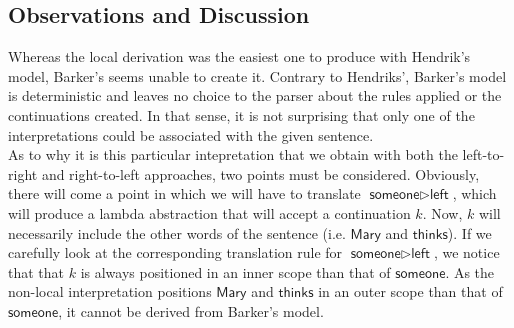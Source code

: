 \documentclass[]{article}
\newcommand{\W}[1]{\textsf{#1}}
\newcommand{\AppL}{\mathbin{\triangleright}}
\begin{document}
\subsection{Observations and Discussion}
Whereas the local derivation was the easiest one to produce with Hendrik's model, Barker's seems unable to create it. Contrary to Hendriks', Barker's model is deterministic and leaves no choice to the parser about the rules applied or the continuations created. In that sense, it is not surprising that only one of the interpretations could be associated with the given sentence.\\
As to why it is this particular intepretation that we obtain with both the left-to-right and right-to-left approaches, two points must be considered. Obviously, there will come a point in which we will have to translate $\W{someone}\AppL\W{left}$, which will produce a lambda abstraction that will accept a continuation $k$.  Now, $k$ will necessarily include the other words of the sentence (i.e. $\W{Mary}$ and $\W{thinks}$). If we carefully look at the corresponding translation rule for $\W{someone}\AppL\W{left}$, we notice that that $k$ is always positioned in an inner scope than that of $\W{someone}$. As the non-local interpretation positions $\W{Mary}$ and $\W{thinks}$ in an outer scope than that of $\W{someone}$, it cannot be derived from Barker's model.\\
\newpage
\end{document}
